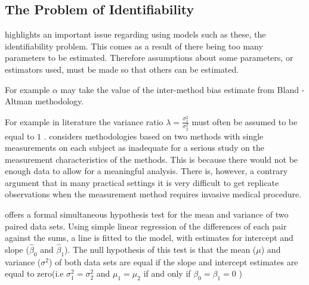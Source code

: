\documentclass[12pt, a4paper]{report}
\theoremstyle{plain}
\theoremstyle{definition}
\theoremstyle{remark}
\begin{document}
\subsection{The Problem of Identifiability}
\citet{DunnSEME} highlights an important issue regarding using
models such as these, the identifiability problem. This comes as a
result of there being too many parameters to be estimated.
Therefore assumptions about some parameters, or estimators used,
must be made so that others can be estimated. 

For example $\alpha$
may take the value of the inter-method bias estimate from Bland -
Altman methodology. 


For example in literature the variance
ratio $\lambda=\frac{\sigma^{2}_{1}}{\sigma^{2}_{2}}$
must often be assumed to be equal to $1$ \citep{linnet98}.\citet{DunnSEME} considers methodologies based on two methods with single measurements on each subject as inadequate for a serious
study on the measurement characteristics of the methods. This is
because there would not be enough data to allow for a meaningful
analysis. There is, however, a contrary argument that in many
practical settings it is very difficult to get replicate
observations when the measurement method requires invasive medical
procedure.

\citet{BB89} offers a formal simultaneous hypothesis test for the
mean and variance of two paired data sets. Using simple linear
regression of the differences of each pair against the sums, a
line is fitted to the model, with estimates for intercept and
slope ($\hat{\beta}_{0}$ and $\hat{\beta}_{1}$). The null
hypothesis of this test is that the mean ($\mu$) and variance
($\sigma^{2}$) of both data sets are equal if the slope and
intercept estimates are equal to zero(i.e $\sigma^{2}_{1} =
\sigma^{2}_{2}$ and $\mu_{1}=\mu_{2}$ if and only if $\beta_{0}=
\beta_{1}=0$ )
\end{document}
